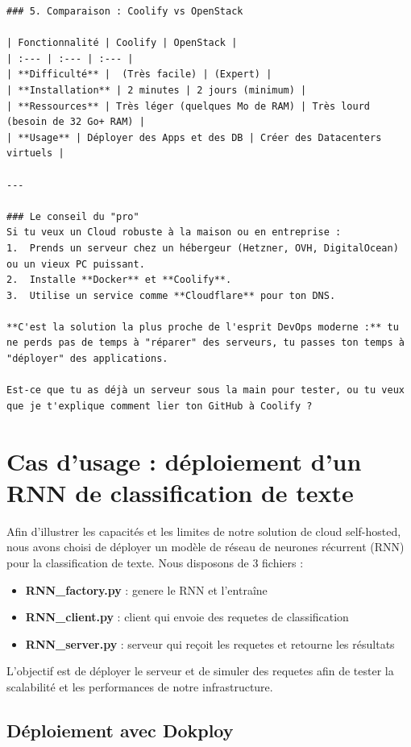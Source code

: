 \documentclass{report} %
\begin{document}
\begin{verbatim}
### 5. Comparaison : Coolify vs OpenStack

| Fonctionnalité | Coolify | OpenStack |
| :--- | :--- | :--- |
| **Difficulté** |  (Très facile) | (Expert) |
| **Installation** | 2 minutes | 2 jours (minimum) |
| **Ressources** | Très léger (quelques Mo de RAM) | Très lourd (besoin de 32 Go+ RAM) |
| **Usage** | Déployer des Apps et des DB | Créer des Datacenters virtuels |

---

### Le conseil du "pro"
Si tu veux un Cloud robuste à la maison ou en entreprise :
1.  Prends un serveur chez un hébergeur (Hetzner, OVH, DigitalOcean) ou un vieux PC puissant.
2.  Installe **Docker** et **Coolify**.
3.  Utilise un service comme **Cloudflare** pour ton DNS.

**C'est la solution la plus proche de l'esprit DevOps moderne :** tu ne perds pas de temps à "réparer" des serveurs, tu passes ton temps à "déployer" des applications.

Est-ce que tu as déjà un serveur sous la main pour tester, ou tu veux que je t'explique comment lier ton GitHub à Coolify ?
\end{verbatim}





\section{Cas d'usage : déploiement d'un RNN de classification de texte}
Afin d'illustrer les capacités et les limites de notre solution de cloud self-hosted, nous avons choisi de déployer un
modèle de réseau de neurones récurrent (RNN) pour la classification de texte.
Nous disposons de 3 fichiers :
\begin{itemize}
\item \textbf{RNN\_factory.py} : genere le RNN et l'entraîne
\item \textbf{RNN\_client.py} : client qui envoie des requetes de classification
\item \textbf{RNN\_server.py} : serveur qui reçoit les requetes et retourne les résultats
\end{itemize}

L'objectif est de déployer le serveur et de simuler des requetes afin de tester la scalabilité et les performances de notre infrastructure.

\subsection{Déploiement avec Dokploy}
\end{document}
